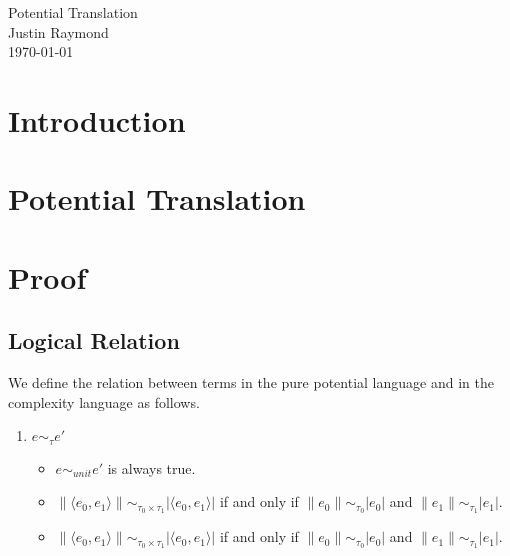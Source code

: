 \documentclass[12pt,letterpaper]{article}
\begin{document}
\begin{flushright}
Potential Translation\\
Justin Raymond\\
\today
\end{flushright}

\section{Introduction}

\section{Potential Translation}

\section{Proof}
\subsection{Logical Relation}
We define the relation between terms in the pure potential language and in the complexity language as follows.
\begin{enumerate}
  \item $e \sim_\tau e'$
    \begin{itemize}
      \item $e \sim_{unit} e'$ is always true.
      \item $\|\langle e_0, e_1\rangle\| \sim_{\tau_0 \times \tau_1} |\langle e_0, e_1 \rangle|$ if and only if $\|e_0\| \sim_{\tau_0} |e_0|$ and $\|e_1\| \sim_{\tau_1} |e_1|$.
      \item $\|\langle e_0, e_1\rangle\| \sim_{\tau_0 \times \tau_1} |\langle e_0, e_1 \rangle|$ if and only if $\|e_0\| \sim_{\tau_0} |e_0|$ and $\|e_1\| \sim_{\tau_1} |e_1|$.
    \end{itemize}
\end{enumerate}
\end{document}
